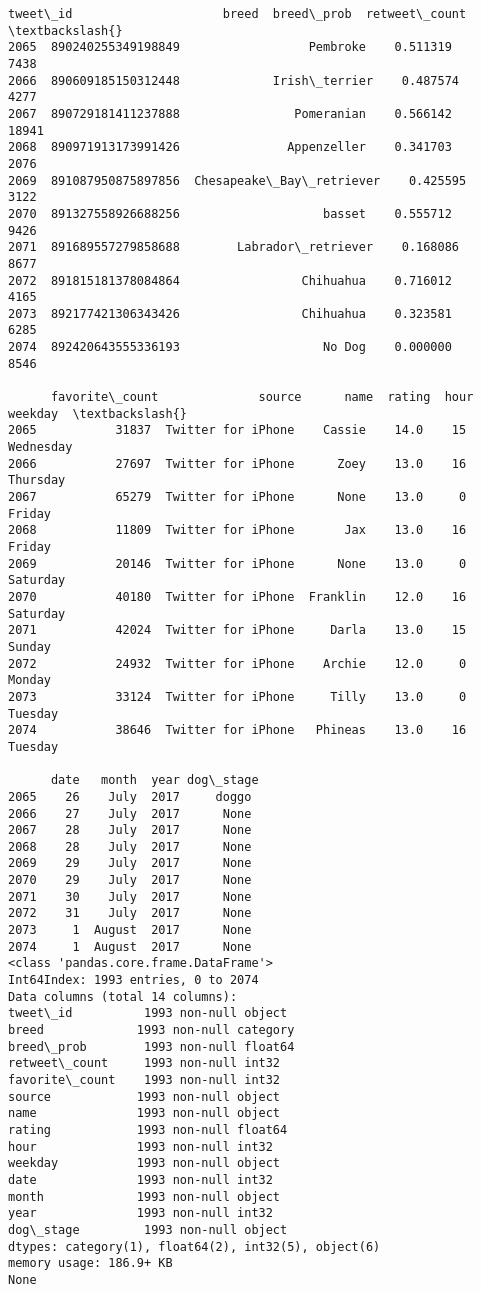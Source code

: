 \documentclass[11pt]{article}
\begin{document}
    \begin{Verbatim}[commandchars=\\\{\}]
                tweet\_id                     breed  breed\_prob  retweet\_count  \textbackslash{}
2065  890240255349198849                  Pembroke    0.511319           7438   
2066  890609185150312448             Irish\_terrier    0.487574           4277   
2067  890729181411237888                Pomeranian    0.566142          18941   
2068  890971913173991426               Appenzeller    0.341703           2076   
2069  891087950875897856  Chesapeake\_Bay\_retriever    0.425595           3122   
2070  891327558926688256                    basset    0.555712           9426   
2071  891689557279858688        Labrador\_retriever    0.168086           8677   
2072  891815181378084864                 Chihuahua    0.716012           4165   
2073  892177421306343426                 Chihuahua    0.323581           6285   
2074  892420643555336193                    No Dog    0.000000           8546   

      favorite\_count              source      name  rating  hour    weekday  \textbackslash{}
2065           31837  Twitter for iPhone    Cassie    14.0    15  Wednesday   
2066           27697  Twitter for iPhone      Zoey    13.0    16   Thursday   
2067           65279  Twitter for iPhone      None    13.0     0     Friday   
2068           11809  Twitter for iPhone       Jax    13.0    16     Friday   
2069           20146  Twitter for iPhone      None    13.0     0   Saturday   
2070           40180  Twitter for iPhone  Franklin    12.0    16   Saturday   
2071           42024  Twitter for iPhone     Darla    13.0    15     Sunday   
2072           24932  Twitter for iPhone    Archie    12.0     0     Monday   
2073           33124  Twitter for iPhone     Tilly    13.0     0    Tuesday   
2074           38646  Twitter for iPhone   Phineas    13.0    16    Tuesday   

      date   month  year dog\_stage  
2065    26    July  2017     doggo  
2066    27    July  2017      None  
2067    28    July  2017      None  
2068    28    July  2017      None  
2069    29    July  2017      None  
2070    29    July  2017      None  
2071    30    July  2017      None  
2072    31    July  2017      None  
2073     1  August  2017      None  
2074     1  August  2017      None  
<class 'pandas.core.frame.DataFrame'>
Int64Index: 1993 entries, 0 to 2074
Data columns (total 14 columns):
tweet\_id          1993 non-null object
breed             1993 non-null category
breed\_prob        1993 non-null float64
retweet\_count     1993 non-null int32
favorite\_count    1993 non-null int32
source            1993 non-null object
name              1993 non-null object
rating            1993 non-null float64
hour              1993 non-null int32
weekday           1993 non-null object
date              1993 non-null int32
month             1993 non-null object
year              1993 non-null int32
dog\_stage         1993 non-null object
dtypes: category(1), float64(2), int32(5), object(6)
memory usage: 186.9+ KB
None

    \end{Verbatim}
\end{document}
